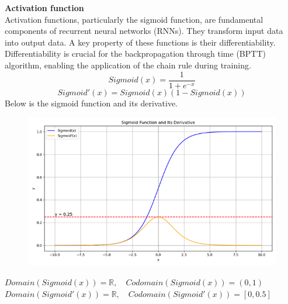 \documentclass[12pt,a4paper]{article}
\begin{document}
\newpage
\textbf{Activation function}\\
Activation functions, particularly the sigmoid function, are fundamental components of recurrent neural networks (RNNs). They transform input data into output data. A key property of these functions is their differentiability. Differentiability is crucial for the backpropagation through time (BPTT) algorithm, enabling the application of the chain rule during training. 
\begin{equation}
    Sigmoid(x) = \frac{ 1 }{ 1+e^{-x} }
\end{equation}
\begin{equation}
    Sigmoid'(x) = Sigmoid(x)(1-Sigmoid(x))
\end{equation}
Below is the sigmoid function and its derivative.
\begin{figure}[!htb]
    \centering
    \includegraphics[width=1\textwidth]{./Pic/sigmoid.png} %
    \label{fig:sigmoid}
\end{figure}
\newline
$Domain(Sigmoid(x))=\mathbb{R},\hspace{1em} Codomain(Sigmoid(x))=(0,1)$\\
$Domain(Sigmoid'(x))=\mathbb{R},\hspace{1em} Codomain(Sigmoid'(x))=[0,0.5]$
\end{document}
